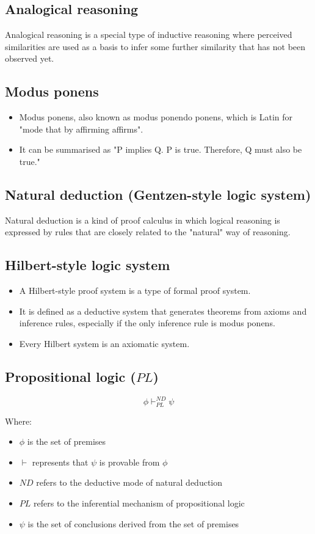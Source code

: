 \documentclass[11pt]{article}
\begin{document}
\subsection{Analogical reasoning}
\label{sec:org05f39d5}
Analogical reasoning is a special type of inductive reasoning where perceived similarities are used as a basis to infer some further similarity that has not been observed yet.
\subsection{Modus ponens}
\label{sec:org4a7de3f}
\begin{itemize}
\item Modus ponens, also known as modus ponendo ponens, which is Latin for "mode that by affirming affirms".
\item It can be summarised as "P implies Q. P is true. Therefore, Q must also be true."
\end{itemize}
\subsection{Natural deduction (Gentzen-style logic system)}
\label{sec:orgb7219e6}
Natural deduction is a kind of proof calculus in which logical reasoning is expressed by rules that are closely related to the "natural" way of reasoning.
\subsection{Hilbert-style logic system}
\label{sec:org6103d4b}
\begin{itemize}
\item A Hilbert-style proof system is a type of formal proof system.
\item It is defined as a deductive system that generates theorems from axioms and inference rules, especially if the only inference rule is modus ponens.
\item Every Hilbert system is an axiomatic system.
\end{itemize}
\subsection{Propositional logic (\(PL\))}
\label{sec:orgea10bd1}
\[\phi \vdash^{ND}_{PL} \psi\]

Where:
\begin{itemize}
\item \(\phi\) is the set of premises
\item \(\vdash\) represents that \(\psi\) is provable from \(\phi\)
\item \(ND\) refers to the deductive mode of natural deduction
\item \(PL\) refers to the inferential mechanism of propositional logic
\item \(\psi\) is the set of conclusions derived from the set of premises
\end{itemize}
\end{document}
